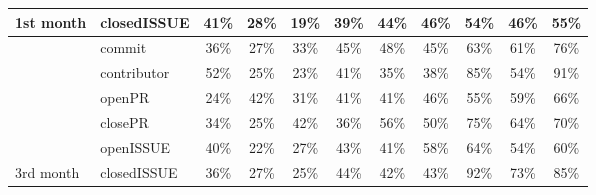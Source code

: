 \documentclass[smallextended]{svjour3}
\begin{document}
\begin{table}[!t]
{\begin{tabular}{llccccccccc}
\multirow{-6}{*}{1st month}          & closedISSUE                          & \cellcolor[HTML]{D3D3D3}41\% & \cellcolor[HTML]{E5E5E5}28\% & \cellcolor[HTML]{F1F1F1}19\% & \cellcolor[HTML]{D6D6D6}39\% & \cellcolor[HTML]{CFCFCF}44\% & \cellcolor[HTML]{CDCDCD}46\% & \cellcolor[HTML]{BBBBBB}54\% & \cellcolor[HTML]{CDCDCD}46\% & \cellcolor[HTML]{B9B9B9}55\% \\ \hline
                                     & commit                               & \cellcolor[HTML]{DADADA}36\% & \cellcolor[HTML]{E6E6E6}27\% & \cellcolor[HTML]{DEDEDE}33\% & \cellcolor[HTML]{CECECE}45\% & \cellcolor[HTML]{C9C9C9}48\% & \cellcolor[HTML]{CECECE}45\% & \cellcolor[HTML]{A7A7A7}63\% & \cellcolor[HTML]{ABABAB}61\% & \cellcolor[HTML]{898989}76\% \\
                                     & contributor                          & \cellcolor[HTML]{BFBFBF}52\% & \cellcolor[HTML]{E8E8E8}25\% & \cellcolor[HTML]{ECECEC}23\% & \cellcolor[HTML]{D4D4D4}41\% & \cellcolor[HTML]{DBDBDB}35\% & \cellcolor[HTML]{D7D7D7}38\% & \cellcolor[HTML]{767676}85\% & \cellcolor[HTML]{BBBBBB}54\% & \cellcolor[HTML]{696969}91\% \\
                                     & openPR                               & \cellcolor[HTML]{EAEAEA}24\% & \cellcolor[HTML]{D2D2D2}42\% & \cellcolor[HTML]{E1E1E1}31\% & \cellcolor[HTML]{D4D4D4}41\% & \cellcolor[HTML]{D3D3D3}41\% & \cellcolor[HTML]{CCCCCC}46\% & \cellcolor[HTML]{B9B9B9}55\% & \cellcolor[HTML]{B1B1B1}59\% & \cellcolor[HTML]{A0A0A0}66\% \\
                                     & closePR                              & \cellcolor[HTML]{DDDDDD}34\% & \cellcolor[HTML]{E9E9E9}25\% & \cellcolor[HTML]{D2D2D2}42\% & \cellcolor[HTML]{DADADA}36\% & \cellcolor[HTML]{B7B7B7}56\% & \cellcolor[HTML]{C4C4C4}50\% & \cellcolor[HTML]{8D8D8D}75\% & \cellcolor[HTML]{A5A5A5}64\% & \cellcolor[HTML]{989898}70\% \\
                                     & openISSUE                            & \cellcolor[HTML]{D5D5D5}40\% & \cellcolor[HTML]{EDEDED}22\% & \cellcolor[HTML]{E6E6E6}27\% & \cellcolor[HTML]{D0D0D0}43\% & \cellcolor[HTML]{D3D3D3}41\% & \cellcolor[HTML]{B3B3B3}58\% & \cellcolor[HTML]{A6A6A6}64\% & \cellcolor[HTML]{BBBBBB}54\% & \cellcolor[HTML]{ADADAD}60\% \\
\multirow{-6}{*}{3rd month}          & closedISSUE                          & \cellcolor[HTML]{DADADA}36\% & \cellcolor[HTML]{E6E6E6}27\% & \cellcolor[HTML]{E9E9E9}25\% & \cellcolor[HTML]{CFCFCF}44\% & \cellcolor[HTML]{D2D2D2}42\% & \cellcolor[HTML]{D1D1D1}43\% & \cellcolor[HTML]{666666}92\% & \cellcolor[HTML]{919191}73\% & \cellcolor[HTML]{777777}85\% \\ \hline

\end{tabular}}
\end{table}
\end{document}
